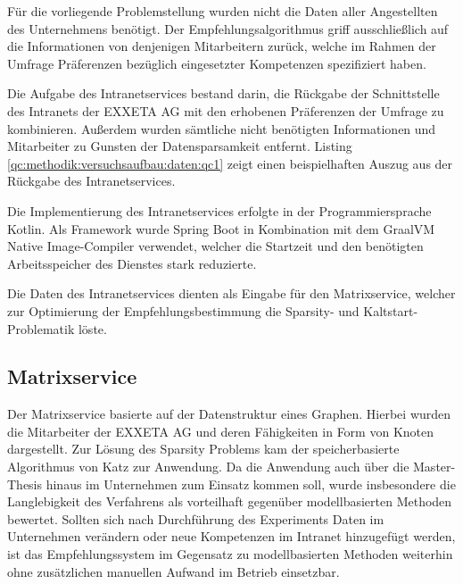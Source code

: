 Für die vorliegende Problemstellung wurden nicht die Daten aller Angestellten des Unternehmens benötigt. Der Empfehlungsalgorithmus griff ausschließlich auf die Informationen von denjenigen Mitarbeitern zurück, welche im Rahmen der Umfrage Präferenzen bezüglich eingesetzter Kompetenzen spezifiziert haben.

Die Aufgabe des Intranetservices bestand darin, die Rückgabe der Schnittstelle des Intranets der EXXETA AG mit den erhobenen Präferenzen der Umfrage zu kombinieren. Außerdem wurden sämtliche nicht benötigten Informationen und Mitarbeiter zu Gunsten der Datensparsamkeit entfernt. Listing \ref{qc:methodik:versuchsaufbau:daten:qc1} zeigt einen beispielhaften Auszug aus der Rückgabe des Intranetservices.



Die Implementierung des Intranetservices erfolgte in der Programmiersprache Kotlin. Als Framework wurde Spring Boot in Kombination mit dem GraalVM Native Image-Compiler verwendet, welcher die Startzeit und den benötigten Arbeitsspeicher des Dienstes stark reduzierte.

Die Daten des Intranetservices dienten als Eingabe für den Matrixservice, welcher zur Optimierung der Empfehlungsbestimmung die Sparsity- und Kaltstart-Problematik löste.

\subsection{Matrixservice}
\label{ch:methodik:versuchsaufbau:systemarchitektur:matrixservice}
Der Matrixservice basierte auf der Datenstruktur eines Graphen. Hierbei wurden die Mitarbeiter der EXXETA AG und deren Fähigkeiten in Form von Knoten dargestellt. Zur Lösung des Sparsity Problems kam der speicherbasierte Algorithmus von Katz zur Anwendung. Da die Anwendung auch über die Master-Thesis hinaus im Unternehmen zum Einsatz kommen soll, wurde insbesondere die Langlebigkeit des Verfahrens als vorteilhaft gegenüber modellbasierten Methoden bewertet. Sollten sich nach Durchführung des Experiments Daten im Unternehmen verändern oder neue Kompetenzen im Intranet hinzugefügt werden, ist das Empfehlungssystem im Gegensatz zu modellbasierten Methoden weiterhin ohne zusätzlichen manuellen Aufwand im Betrieb einsetzbar.

